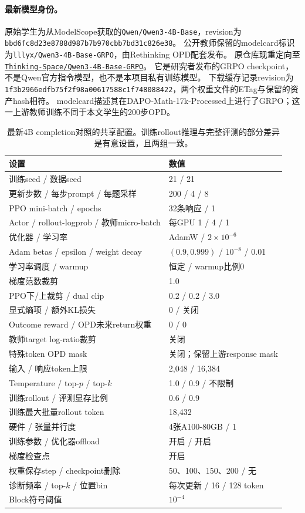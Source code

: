 \paragraph{最新模型身份。}
原始学生为从ModelScope获取的\texttt{Qwen/Qwen3-4B-Base}，revision为
\texttt{bbd6fc8d23e8788d987b7b970cbb7bd31c826e38}。
公开教师保留的modelcard标识为\texttt{lllyx/Qwen3-4B-Base-GRPO}，由Rethinking OPD\citep{rethinking}配套发布。
原仓库现重定向至\href{https://huggingface.co/Thinking-Space/Qwen3-4B-Base-GRPO}{\texttt{Thinking-Space/Qwen3-4B-Base-GRPO}}。
它是研究者发布的GRPO checkpoint，不是Qwen官方指令模型，也不是本项目私有训练模型。
下载缓存记录revision为\texttt{1f3b2966edfb75f2f98a00617588c1f748088422}，两个权重文件的ETag与保留的资产hash相符。
modelcard描述其在DAPO-Math-17k-Processed上进行了GRPO；这一上游教师训练不同于本文学生的200步OPD。

\begin{table}[h]
\caption{最新4B completion对照的共享配置。训练rollout推理与完整评测的部分差异是有意设置，且两组一致。}
\centering\small
\begin{tabular}{@{}p{2.5in}p{2.65in}@{}}
\toprule
设置 & 数值 \\
\midrule
训练seed / 数据seed & 21 / 21 \\
更新步数 / 每步prompt / 每题采样 & 200 / 4 / 8 \\
PPO mini-batch / epochs & 32条响应 / 1 \\
Actor / rollout-logprob / 教师micro-batch & 每GPU 1 / 4 / 1 \\
优化器 / 学习率 & AdamW / $2\times10^{-6}$ \\
Adam betas / epsilon / weight decay & $(0.9,0.999)$ / $10^{-8}$ / 0.01 \\
学习率调度 / warmup & 恒定 / warmup比例0 \\
梯度范数裁剪 & 1.0 \\
PPO下/上裁剪 / dual clip & 0.2 / 0.2 / 3.0 \\
显式熵项 / 额外KL损失 & 0 / 关闭 \\
Outcome reward / OPD未来return权重 & 0 / 0 \\
教师target log-ratio裁剪 & 关闭 \\
特殊token OPD mask & 关闭；保留上游response mask \\
输入 / 响应token上限 & 2,048 / 16,384 \\
Temperature / top-$p$ / top-$k$ & 1.0 / 0.9 / 不限制 \\
训练rollout / 评测显存比例 & 0.6 / 0.9 \\
训练最大批量rollout token & 18,432 \\
硬件 / 张量并行度 & 4张A100-80GB / 1 \\
训练参数 / 优化器offload & 开启 / 开启 \\
梯度检查点 & 开启 \\
权重保存step / checkpoint删除 & 50、100、150、200 / 无 \\
诊断频率 / top-$k$ / 位置bin & 每次更新 / 16 / 128 token \\
Block符号阈值 & $10^{-4}$ \\
\bottomrule
\end{tabular}
\end{table}

